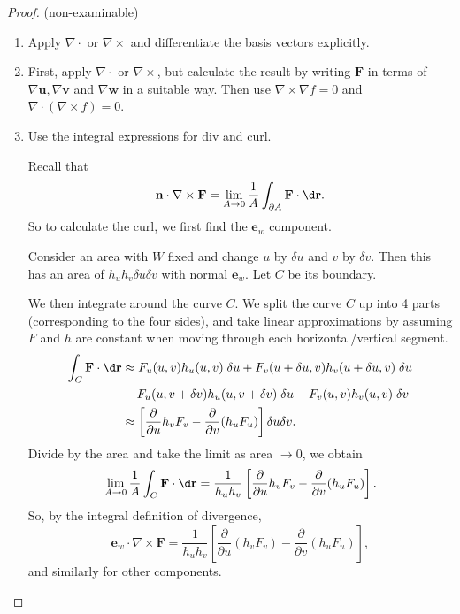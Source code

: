 \documentclass[a4paper]{article}
\begin{document}
\begin{proof}(non-examinable)
  \begin{enumerate}
    \item Apply $\nabla\cdot$ or $\nabla\times$ and differentiate the basis vectors explicitly.
    \item First, apply $\nabla\cdot$ or $\nabla\times$, but calculate the result by writing $\mathbf{F}$ in terms of $\nabla \mathbf{u}, \nabla \mathbf{v}$ and $\nabla \mathbf{w}$ in a suitable way. Then use $\nabla\times \nabla f = 0$ and $\nabla\cdot (\nabla\times f) = 0$.
    \item Use the integral expressions for div and curl.

      Recall that
      \[
        \mathbf{n}\cdot \nabla \times \mathbf{F} = \lim_{A \to 0}\frac{1}{A}\int_{\partial A}\mathbf{F}\cdot \d \mathbf{r}.
      \]
      So to calculate the curl, we first find the $\mathbf{e}_w$ component.

      Consider an area with $W$ fixed and change $u$ by $\delta u$ and $v$ by $\delta v$. Then this has an area of $h_u h_v \delta u\delta v$ with normal $\mathbf{e}_w$. Let $C$ be its boundary.
      \begin{center}
      \end{center}
      We then integrate around the curve $C$. We split the curve $C$ up into 4 parts (corresponding to the four sides), and take linear approximations by assuming $F$ and $h$ are constant when moving through each horizontal/vertical segment.
      \begin{align*}
        \int_C \mathbf{F}\cdot \d \mathbf{r} &\approx F_u(u, v) h_u(u, v)\;\delta u + F_v(u + \delta u, v) h_v(u + \delta u, v)\;\delta u \\
        &- F_u(u, v + \delta v)h_u (u, v + \delta v)\; \delta u - F_v(u, v)h_v(u, v)\;\delta v\\
        &\approx \left[\frac{\partial}{\partial u}h_vF_v - \frac{\partial}{\partial v}(h_uF_u)\right]\delta u\delta v.
      \end{align*}
      Divide by the area and take the limit as area $\to 0$, we obtain
      \[
        \lim_{A \to 0} \frac{1}{A}\int_C \mathbf{F}\cdot \d \mathbf{r} = \frac{1}{h_uh_v}\left[\frac{\partial}{\partial u}h_vF_v - \frac{\partial}{\partial v}(h_u F_u)\right].
      \]
      So, by the integral definition of divergence,
      \[
        \mathbf{e}_w\cdot \nabla\times \mathbf{F} = \frac{1}{h_uh_v}\left[\frac{\partial }{\partial u}(h_vF_v) - \frac{\partial }{\partial v}(h_uF_u)\right],
      \]
      and similarly for other components.


\end{enumerate}
\end{proof}
\end{document}
